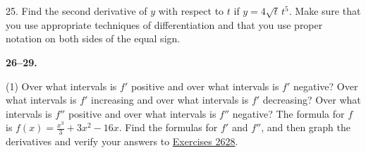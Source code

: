 \documentclass[10pt,oneside,]{book}
\theoremstyle{plain}
\theoremstyle{definition}
\numberwithin{equation}{section}
\newcounter{figstack}
\newcounter{figindex}
\newlength\fight
\newcommand\pushValignCaptionBottom[5][b]{%
\stepcounter{figstack}%
\expandafter\def\csname %
figalign\romannumeral\value{figstack}\endcsname{#1}%
\expandafter\def\csname %
figtype\romannumeral\value{figstack}\endcsname{#2}%
\expandafter\def\csname %
figwd\romannumeral\value{figstack}\endcsname{#3}%
\expandafter\def\csname %
figcontent\romannumeral\value{figstack}\endcsname{#4}%
\expandafter\def\csname %
figcap\romannumeral\value{figstack}\endcsname{#5}%
\setbox0=\hbox{%
\begin{#2}{#3}#4\end{#2}}%
\ifdim\dimexpr\ht0+\dp0\relax>\fight\global\setlength{\fight}{%
\dimexpr\ht0+\dp0\relax}\fi%
}
\newcommand\popValignCaptionBottom{%
\setcounter{figindex}{0}%
\hfill%
\whiledo{\value{figindex}<\value{figstack}}{%
\stepcounter{figindex}%
\def\tmp{\csname figwd\romannumeral\value{figindex}\endcsname}%
\begin{\csname figtype\romannumeral\value{figindex}\endcsname}[t]{\tmp}%
\centering%
\stackinset{c}{}%
{\csname figalign\romannumeral\value{figindex}\endcsname}{}%
{\csname figcontent\romannumeral\value{figindex}\endcsname}%
{\rule{0pt}{\fight}}\par%
\csname figcap\romannumeral\value{figindex}\endcsname%
\end{\csname figtype\romannumeral\value{figindex}\endcsname}%
\hfill%
}%
\setcounter{figstack}{0}%
\setlength{\fight}{0pt}%
\hfill%
}
\newcommand{\fe}[2]{#1\mathopen{}\left(#2\right)\mathclose{}}
\newcommand{\fd}[1]{#1'}
\newcommand{\sd}[1]{#1''}
\begin{document}
\begin{exerciselist}
\item[25.]\hypertarget{exercise-426}{\null}Find the second derivative of \(y\) with respect to \(t\) if \(y=4\sqrt{t}\,t^5\).  Make sure that you use appropriate techniques of differentiation and that you use proper notation on both sides of the equal sign.%
\par\smallskip
\textbf{26--29. }\hypertarget{exercisegroup-89}{\null}
\par
\begin{exercisegroup}(1)
\exercise[26.]\hypertarget{exercise-analyze-intervals-from-graph-first}{\null}Over what intervals is \(\fd{f}\) positive and over what intervals is \(\fd{f}\) negative?%
\exercise[27.]\hypertarget{exercise-428}{\null}Over what intervals is \(\fd{f}\) increasing and over what intervals is \(\fd{f}\) decreasing?%
\exercise[28.]\hypertarget{exercise-analyze-intervals-from-graph-third}{\null}Over what intervals is \(\sd{f}\) positive and over what intervals is \(\sd{f}\) negative?%
\exercise[29.]\hypertarget{exercise-430}{\null}The formula for \(f\) is \(\fe{f}{x}=\frac{x^3}{3}+3x^2-16x\).  Find the formulas for \(\fd{f}\) and \(\sd{f}\), and then graph the derivatives and verify your answers to \hyperlink{exercise-analyze-intervals-from-graph-first}{Exercises 26}\textendash{}\hyperlink{exercise-analyze-intervals-from-graph-third}{28}.%

\end{exercisegroup}
\end{exerciselist}
\end{document}

